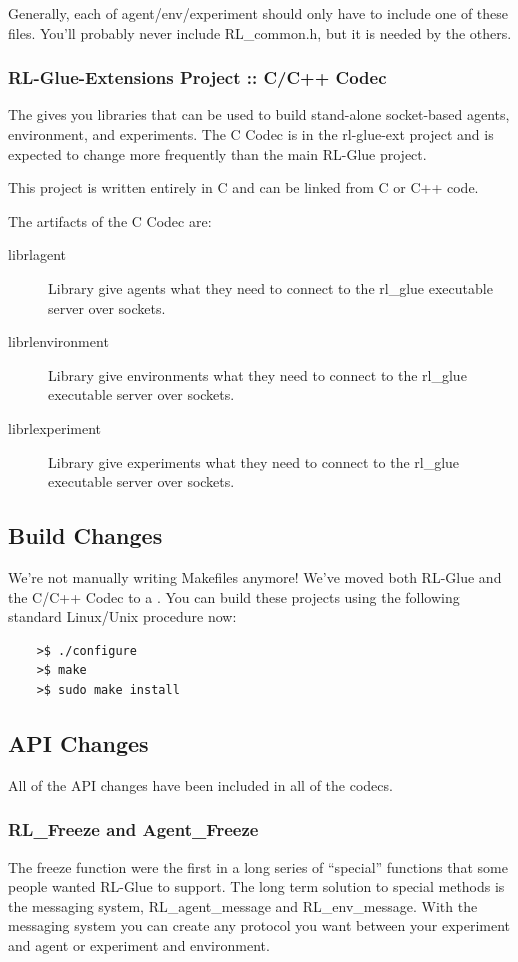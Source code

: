 \documentclass[11pt]{article}
\begin{document}
Generally, each of agent/env/experiment should only have to include one of these files.  You'll probably never include RL\_common.h, but it is needed by the others.

\subsubsection{RL-Glue-Extensions Project :: C/C++ Codec}
The  gives you libraries that can be used to build stand-alone socket-based agents, environment, and experiments.  The C Codec is in the rl-glue-ext project and is expected to change more frequently than the main RL-Glue project.

This project is written entirely in C and can be linked from C or C++ code.

The artifacts of the C Codec are:
\begin{description}
	\item [librlagent] Library give agents what they need to connect to the rl\_glue executable server over sockets.
	\item [librlenvironment] Library give environments what they need to connect to the rl\_glue executable server over sockets.
	\item [librlexperiment] Library give experiments what they need to connect to the rl\_glue executable server over sockets.
\end{description}

\subsection{Build Changes}
We're not manually writing Makefiles anymore!  We've moved both RL-Glue and the C/C++ Codec to a . You can build these projects using the following standard Linux/Unix procedure now:
\begin{verbatim}
	>$ ./configure
	>$ make
	>$ sudo make install
\end{verbatim}

\subsection{API Changes}
All of the API changes have been included in all of the codecs.

\subsubsection{RL\_Freeze and Agent\_Freeze}
The freeze function were the first in a long series of ``special'' functions that some people wanted RL-Glue to support.  The long term solution to special methods is the messaging system, RL\_agent\_message and RL\_env\_message. With the messaging system you can create any protocol you want between your experiment and agent or experiment and environment.
\end{document}
